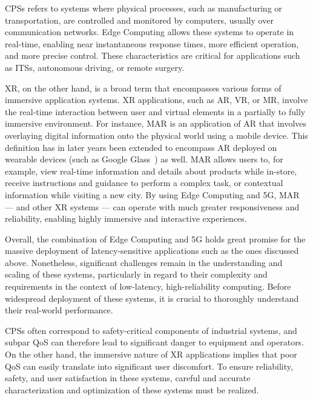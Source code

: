 \glspl{CPS} refers to systems where physical processes, such as manufacturing or transportation, are controlled  and monitored by computers, usually over communication networks.
Edge Computing allows these systems to operate in real-time, enabling near instantaneous response times, more efficient operation, and more precise control.
These characteristics are critical for applications such as \glspl{ITS}, autonomous driving, or remote surgery.

\gls{XR}, on the other hand, is a broad term that encompasses various forms of immersive application systems.
\gls{XR} applications, such as \gls{AR}, \gls{VR}, or \gls{MR}, involve the real-time interaction between user and virtual elements in a partially to fully immersive environment.
For instance, \gls{MAR} is an application of \gls{AR} that involves overlaying digital information onto the physical world using a mobile device.
This definition has in later years been extended to encompass \gls{AR} deployed on wearable devices (such as Google Glass~\cite{googleglass}) as well.
\gls{MAR} allows users to, for example, view real-time information and details about products while in-store, receive instructions and guidance to perform a complex task, or contextual information while visiting a new city.
By using Edge Computing and 5G, \gls{MAR} --- and other \gls{XR} systems --- can operate with much greater responsiveness and reliability, enabling highly immersive and interactive experiences.

Overall, the combination of Edge Computing and 5G holds great promise for the massive deployment of latency-sensitive applications such as the ones discussed above.
Nonetheless, significant challenges remain in the understanding and scaling of these systems, particularly in regard to their complexity and requirements in the context of low-latency, high-reliability computing.
Before widespread deployment of these systems, it is crucial to thoroughly understand their real-world performance.

\glspl{CPS} often correspond to safety-critical components of industrial systems, and subpar \gls{QoS} can therefore lead to significant danger to equipment and operators.
On the other hand, the immersive nature of \gls{XR} applications implies that poor \gls{QoS} can easily translate into significant user discomfort.
To ensure reliability, safety, and user satisfaction in these systems, careful and accurate characterization and optimization of these systems must be realized.

